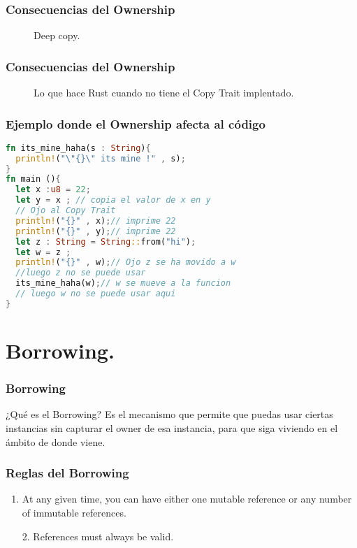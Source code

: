 \documentclass{beamer}
\begin{document}
\begin{frame}
  \frametitle{Consecuencias del Ownership}
  \begin{figure}[0.5\textwidth]
    \center 
    \caption{Deep copy.}
    \label{fig:deep}
  \end{figure}
\end{frame}

\begin{frame}
  \frametitle{Consecuencias del Ownership}
  \begin{figure}[0.5\textwidth]
    \center 
    \caption{Lo que hace Rust cuando no tiene el Copy Trait implentado.}
    \label{fig:copy_trait}
  \end{figure}
\end{frame}

\begin{frame}[fragile]
  \frametitle{Ejemplo donde el Ownership afecta al código}
  \begin{lstlisting}[language=Rust, style=boxed ]
fn its_mine_haha(s : String){ 
  println!("\"{}\" its mine !" , s); 
}
fn main (){
  let x :u8 = 22;
  let y = x ; // copia el valor de x en y 
  // Ojo al Copy Trait
  println!("{}" , x);// imprime 22
  println!("{}" , y);// imprime 22
  let z : String = String::from("hi");
  let w = z ;
  println!("{}" , w);// Ojo z se ha movido a w 
  //luego z no se puede usar 
  its_mine_haha(w);// w se mueve a la funcion 
  // luego w no se puede usar aqui
}\end{lstlisting}

\end{frame}

\section{Borrowing.}
\begin{frame}
  \frametitle{Borrowing}
  \begin{block}{¿Qué es el Borrowing?}
    Es el mecanismo que permite que puedas usar ciertas instancias sin capturar
    el owner de esa instancia, para que siga viviendo en el ámbito de donde viene.
  \end{block}
\end{frame}

\begin{frame}
  \frametitle{Reglas del Borrowing}
  
\begin{enumerate}[1.]
  \item At any given time, you can have either one mutable reference or any number of immutable references. 
  \pause
  \item[2.] References must always be valid.
\end{enumerate}
\end{frame}
\end{document}
